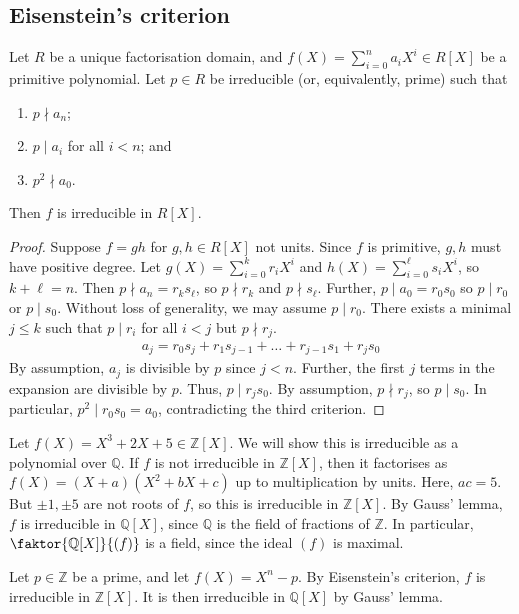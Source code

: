 \subsection{Eisenstein's criterion}
\begin{proposition}
	Let $R$ be a unique factorisation domain, and $f(X) = \sum_{i=0}^n a_i X^i \in R[X]$ be a primitive polynomial.
	Let $p \in R$ be irreducible (or, equivalently, prime) such that
	\begin{enumerate}
		\item $p \nmid a_n$;
		\item $p \mid a_i$ for all $i < n$; and
		\item $p^2 \nmid a_0$.
	\end{enumerate}
	Then $f$ is irreducible in $R[X]$.
\end{proposition}
\begin{proof}
	Suppose $f = gh$ for $g,h \in R[X]$ not units.
	Since $f$ is primitive, $g, h$ must have positive degree.
	Let $g(X) = \sum_{i=0}^k r_i X^i$ and $h(X) = \sum_{i=0}^\ell s_i X^i$, so $k + \ell = n$.
	Then $p \nmid a_n = r_k s_\ell$, so $p \nmid r_k$ and $p \nmid s_\ell$.
	Further, $p \mid a_0 = r_0 s_0$ so $p \mid r_0$ or $p \mid s_0$.
	Without loss of generality, we may assume $p \mid r_0$.
	There exists a minimal $j \leq k$ such that $p \mid r_i$ for all $i < j$ but $p \nmid r_j$.
	\begin{align*}
		a_j = r_0 s_j + r_1 s_{j-1} + \dots + r_{j-1} s_1 + r_j s_0
	\end{align*}
	By assumption, $a_j$ is divisible by $p$ since $j < n$.
	Further, the first $j$ terms in the expansion are divisible by $p$.
	Thus, $p \mid r_j s_0$.
	By assumption, $p \nmid r_j$, so $p \mid s_0$.
	In particular, $p^2 \mid r_0 s_0 = a_0$, contradicting the third criterion.
\end{proof}
\begin{example}
	Let $f(X) = X^3 + 2X + 5 \in \mathbb Z[X]$.
	We will show this is irreducible as a polynomial over $\mathbb Q$.
	If $f$ is not irreducible in $\mathbb Z[X]$, then it factorises as $f(X) = (X+a)(X^2 + bX + c)$ up to multiplication by units.
	Here, $ac = 5$.
	But $\pm 1, \pm 5$ are not roots of $f$, so this is irreducible in $\mathbb Z[X]$.
	By Gauss' lemma, $f$ is irreducible in $\mathbb Q[X]$, since $\mathbb Q$ is the field of fractions of $\mathbb Z$.
	In particular, $\faktor{\mathbb Q[X]}{(f)}$ is a field, since the ideal $(f)$ is maximal.
\end{example}
\begin{example}
	Let $p \in \mathbb Z$ be a prime, and let $f(X) = X^n - p$.
	By Eisenstein's criterion, $f$ is irreducible in $\mathbb Z[X]$.
	It is then irreducible in $\mathbb Q[X]$ by Gauss' lemma.
\end{example}
